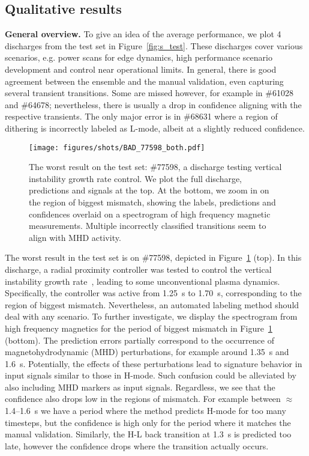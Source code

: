 \subsection{Qualitative results}\label{sec:qualitative}
\textbf{General overview.} To give an idea of the average performance, we plot 4 discharges from the test set in Figure~\ref{fig:s_test}. These discharges cover various scenarios, e.g. power scans for edge dynamics, high performance scenario development and control near operational limits. In general, there is good agreement between the ensemble and the manual validation, even capturing several transient transitions. Some are missed however, for example in \#61028 and \#64678; nevertheless, there is usually a drop in confidence aligning with the respective transients. The only major error is in \#68631 where a region of dithering is incorrectly labeled as L-mode, albeit at a slightly reduced confidence.

\begin{figure}[t]
\begin{center}\texttt{[image: figures/shots/BAD\_77598\_both.pdf]}\end{center}
    \caption{The worst result on the test set: \#77598, a discharge testing vertical instability growth rate control. We plot the full discharge, predictions and signals at the top. At the bottom, we zoom in on the region of biggest mismatch, showing the labels, predictions and confidences overlaid on a spectrogram of high frequency magnetic measurements. Multiple incorrectly classified transitions seem to align with MHD activity.}
    \label{fig:s_test_worst}%
\end{figure}

The worst result in the test set is on \#77598, depicted in Figure~\ref{fig:s_test_worst} (top). In this discharge, a radial proximity controller was tested to control the vertical instability growth rate~\cite{marchioni2024}, leading to some unconventional plasma dynamics. Specifically, the controller was active from \SI{1.25}{\second} to \SI{1.70}{\second}, corresponding to the region of biggest mismatch. Nevertheless, an automated labeling method should deal with any scenario. To further investigate, we display the spectrogram from high frequency magnetics for the period of biggest mismatch in Figure~\ref{fig:s_test_worst} (bottom). The prediction errors partially correspond to the occurrence of magnetohydrodynamic (MHD) perturbations, for example around \SI{1.35}{\second} and \SI{1.6}{\second}. Potentially, the effects of these perturbations lead to signature behavior in input signals similar to those in H-mode. Such confusion could be alleviated by also including MHD markers as input signals. Regardless, we see that the confidence also drops low in the regions of mismatch. For example between {$\approx$\numrange{1.4}{1.6}\SI{}{\second}} we have a period where the method predicts H-mode for too many timesteps, but the confidence is high only for the period where it matches the manual validation. Similarly, the H-L back transition at \SI{1.3}{\second} is predicted too late, however the confidence drops where the transition actually occurs. %

